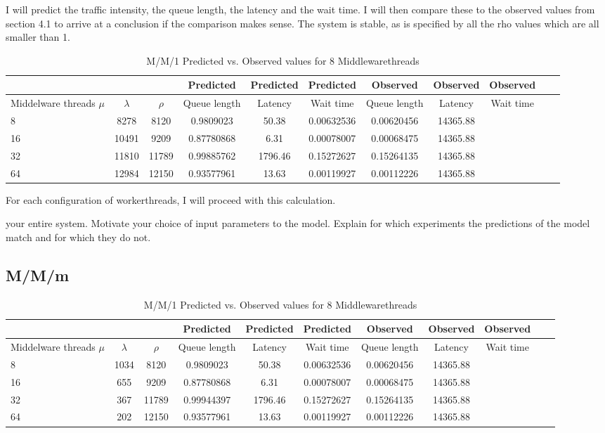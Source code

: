\documentclass[11pt,a4paper]{article}
\begin{document}
I will predict the traffic intensity, the queue length, the latency and the wait time.
I will then compare these to the observed values from section 4.1 to arrive at a conclusion if the comparison makes sense.
The system is stable, as is specified by all the rho values which are all smaller than 1.

\begin{table}[H]
	\caption{M/M/1 Predicted vs. Observed values for 8 Middlewarethreads}
	\scriptsize{
		\begin{tabular}{|l|c|c|c|c|c|c|c|c|c|c|}
					\hline & & & Predicted & Predicted & Predicted & Observed & Observed & Observed &\\ 
			\hline Middelware threads $\mu$ & $\lambda$ & $\rho$ & Queue length & Latency & Wait time & Queue length & Latency & Wait time \\ 
			\hline 8 & 8278 & 8120 & 0.9809023 & 50.38 & 0.00632536 & 0.00620456 &  14365.88 \\ 
			\hline 16 & 10491 & 9209 & 0.87780868 & 6.31 & 0.00078007 & 0.00068475 &  14365.88 \\ 
			\hline 32 & 11810 & 11789 & 0.99885762 & 1796.46 & 0.15272627 & 0.15264135 &  14365.88 \\ 
			\hline 64 & 12984 & 12150 & 0.93577961 & 13.63 & 0.00119927 & 0.00112226 &  14365.88 \\ 
			\hline
		\end{tabular}
	} 
\end{table}

For each configuration of workerthreads, I will proceed with this calculation.


your entire system. Motivate your choice of input parameters to the model. Explain for which experiments the predictions of the model match and for which they do not.

\subsection{M/M/m}


\begin{table}[H]
	\caption{M/M/1 Predicted vs. Observed values for 8 Middlewarethreads}
	\scriptsize{
		\begin{tabular}{|l|c|c|c|c|c|c|c|c|c|c|}
					\hline & & & Predicted & Predicted & Predicted & Observed & Observed & Observed &\\ 
			\hline Middelware threads $\mu$ & $\lambda$ & $\rho$ & Queue length & Latency & Wait time & Queue length & Latency & Wait time \\ 
			\hline 8 & 1034 & 8120 & 0.9809023 & 50.38 & 0.00632536 & 0.00620456 &  14365.88 \\ 
			\hline 16 & 655 & 9209 & 0.87780868 & 6.31 & 0.00078007 & 0.00068475 &  14365.88 \\ 
			\hline 32 & 367 & 11789 & 0.99944397 & 1796.46 & 0.15272627 & 0.15264135 &  14365.88 \\ 
			\hline 64 & 202 & 12150 & 0.93577961 & 13.63 & 0.00119927 & 0.00112226 &  14365.88 \\ 
			\hline
		\end{tabular}
	} 
\end{table}
\end{document}
